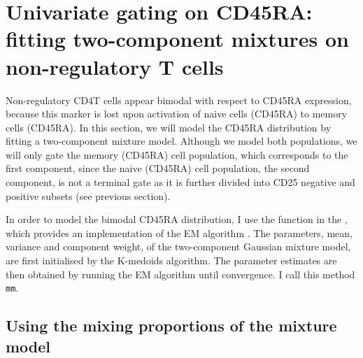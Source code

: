 \section{Univariate gating on CD45RA: fitting two-component mixtures on non-regulatory T cells}

Non-regulatory CD4\positive T cells appear bimodal with respect to CD45RA expression,
because this marker is lost upon activation of naive cells (CD45RA\positive) to memory cells (CD45RA\negative).
In this section, we will model the CD45RA distribution by fitting a two-component mixture model.
Although we model both populations, we will only gate the memory (CD45RA\negative) cell population, which corresponds to the first component,
since the naive (CD45RA\positive) cell population, the second component, is not a terminal gate as
it is further divided into CD25 negative and positive subsets (see previous section).

In order to model the bimodal CD45RA distribution, I use the  function in the ,
which provides an implementation of the \Gls{EM} algorithm \citep{Dempster:1977ul}.
The parameters, mean, variance and component weight, of the two-component Gaussian mixture model,
are first initialised by the K-medoids algorithm.
The parameter estimates are then obtained  by running the EM algorithm until convergence.
I call this method \texttt{mm}.

\subsection{Using the mixing proportions of the mixture model}

